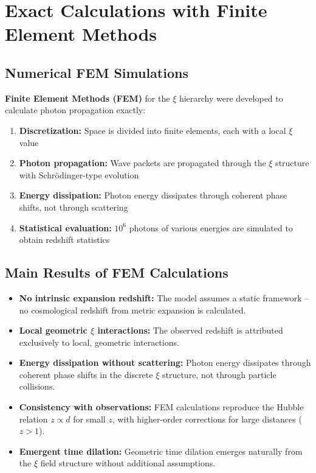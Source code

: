 \section{Exact Calculations with Finite Element Methods}

\subsection{Numerical FEM Simulations}

\textbf{Finite Element Methods (FEM)} for the $\xi$ hierarchy were developed 
to calculate photon propagation exactly:

\begin{enumerate}
\item \textbf{Discretization:} 
      Space is divided into finite elements, each with a local $\xi$ value

\item \textbf{Photon propagation:} 
      Wave packets are propagated through the $\xi$ structure with 
      Schr\"odinger-type evolution

\item \textbf{Energy dissipation:} 
      Photon energy dissipates through coherent phase shifts, not through 
      scattering

\item \textbf{Statistical evaluation:} 
      $10^6$ photons of various energies are simulated to obtain redshift 
      statistics
\end{enumerate}

\subsection{Main Results of FEM Calculations}

\begin{itemize}
\item \textbf{No intrinsic expansion redshift:} 
      The model assumes a static framework -- no cosmological redshift from 
      metric expansion is calculated.

\item \textbf{Local geometric $\xi$ interactions:} 
      The observed redshift is attributed exclusively to local, geometric 
      interactions.

\item \textbf{Energy dissipation without scattering:} 
      Photon energy dissipates through coherent phase shifts in the discrete 
      $\xi$ structure, not through particle collisions.

\item \textbf{Consistency with observations:} 
      FEM calculations reproduce the Hubble relation $z \propto d$ for small 
      $z$, with higher-order corrections for large distances ($z > 1$).

\item \textbf{Emergent time dilation:} 
      Geometric time dilation emerges naturally from the $\xi$ field structure 
      without additional assumptions.
\end{itemize}

